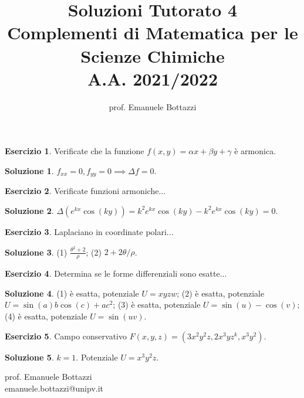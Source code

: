 \documentclass[12pt,a4paper]{article}
\title{Soluzioni Tutorato 4\\Complementi di Matematica per le Scienze Chimiche\\ A.A. 2021/2022}
\author{prof. Emanuele Bottazzi}
\date{}
\theoremstyle{definition}
\newtheorem{exe}{Esercizio}
\newtheorem*{sol}{Soluzione}
\begin{document}
\maketitle

\begin{exe}
    Verificate che la funzione $f(x,y) = \alpha x + \beta y + \gamma$ è armonica.
\end{exe}
\begin{sol}
    $f_{xx} = 0, f_{yy} = 0 \implies \Delta f = 0$.
\end{sol}

\begin{exe}
    Verificate funzioni armoniche...
\end{exe}
\begin{sol}
    $\Delta(e^{kx}\cos(ky)) = k^2 e^{kx}\cos(ky) - k^2 e^{kx}\cos(ky) = 0$.
\end{sol}

\begin{exe}
    Laplaciano in coordinate polari...
\end{exe}
\begin{sol}
    (1) $\frac{\theta^2 + 2}{\rho}$; (2) $2 + 2\theta/\rho$.
\end{sol}

\begin{exe}
    Determina se le forme differenziali sono esatte...
\end{exe}
\begin{sol}
    (1) è esatta, potenziale $U = xyzw$;
    (2) è esatta, potenziale $U = \sin(a)b \cos(c) + ac^2$;
    (3) è esatta, potenziale $U = \sin(u) - \cos(v)$;
    (4) è esatta, potenziale $U = \sin(uv)$.
\end{sol}

\begin{exe}
    Campo conservativo $F(x,y,z) = (3x^2 y^2 z, 2x^3 y z^k, x^3 y^2)$.
\end{exe}
\begin{sol}
    $k=1$. Potenziale $U = x^3 y^2 z$.
\end{sol}

\begin{center}
    prof. Emanuele Bottazzi\\
    emanuele.bottazzi@unipv.it
\end{center}
\end{document}
